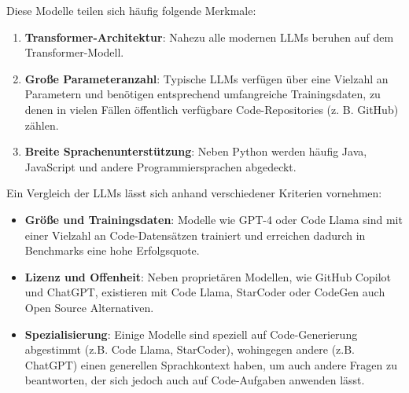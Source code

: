 \documentclass[11pt,a4paper]{article}
\begin{document}
Diese Modelle teilen sich häufig folgende Merkmale:
\begin{enumerate}
    \item \textbf{Transformer-Architektur}: Nahezu alle modernen LLMs beruhen auf dem Transformer-Modell.
    \item \textbf{Große Parameteranzahl}: Typische LLMs verfügen über eine Vielzahl an Parametern und benötigen entsprechend umfangreiche Trainingsdaten, zu denen in vielen Fällen öffentlich verfügbare Code-Repositories (z. B. GitHub) zählen\cite{chen2021evaluatinglargelanguagemodels}.
    \item \textbf{Breite Sprachenunterstützung}: Neben Python werden häufig Java, JavaScript und andere Programmiersprachen abgedeckt\cite{chen2021evaluatinglargelanguagemodels,jiang2024surveylargelanguagemodels}.
\end{enumerate}
Ein Vergleich der LLMs lässt sich anhand verschiedener Kriterien vornehmen:
\begin{itemize}
    \item \textbf{Größe und Trainingsdaten}: Modelle wie GPT-4 oder Code Llama sind mit einer Vielzahl an Code-Datensätzen trainiert und erreichen dadurch in Benchmarks eine hohe Erfolgsquote\cite{NEURIPS2023_43e9d647}.
    \item \textbf{Lizenz und Offenheit}: Neben proprietären Modellen, wie GitHub Copilot und ChatGPT, existieren mit Code Llama, StarCoder oder CodeGen auch Open Source Alternativen.
    \item \textbf{Spezialisierung}: Einige Modelle sind speziell auf Code-Generierung abgestimmt (z.B. Code Llama, StarCoder), wohingegen andere (z.B. ChatGPT) einen generellen Sprachkontext haben, um auch andere Fragen zu beantworten, der sich jedoch auch auf Code-Aufgaben anwenden lässt.
\end{itemize}
\end{document}
